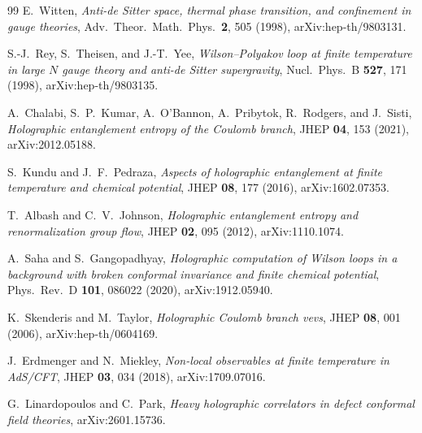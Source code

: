\documentclass[
  aps,
  prd,
  preprint,
  groupedaddress,
  nofootinbib,
  longbibliography
]{revtex4-2}
\theoremstyle{remark}
\begin{document}
\begin{thebibliography}{99}
E.~Witten,
\textit{Anti-de Sitter space, thermal phase transition, and confinement in gauge theories},
Adv.\ Theor.\ Math.\ Phys.\ \textbf{2}, 505 (1998),
arXiv:hep-th/9803131.

S.-J.~Rey, S.~Theisen, and J.-T.~Yee,
\textit{Wilson--Polyakov loop at finite temperature in large $N$ gauge theory and anti-de Sitter supergravity},
Nucl.\ Phys.\ B \textbf{527}, 171 (1998),
arXiv:hep-th/9803135.

A.~Chalabi, S.~P.~Kumar, A.~O'Bannon, A.~Pribytok, R.~Rodgers, and J.~Sisti,
\textit{Holographic entanglement entropy of the Coulomb branch},
JHEP \textbf{04}, 153 (2021),
arXiv:2012.05188.

S.~Kundu and J.~F.~Pedraza,
\textit{Aspects of holographic entanglement at finite temperature and chemical potential},
JHEP \textbf{08}, 177 (2016),
arXiv:1602.07353.

T.~Albash and C.~V.~Johnson,
\textit{Holographic entanglement entropy and renormalization group flow},
JHEP \textbf{02}, 095 (2012),
arXiv:1110.1074.

A.~Saha and S.~Gangopadhyay,
\textit{Holographic computation of Wilson loops in a background with broken conformal invariance and finite chemical potential},
Phys.\ Rev.\ D \textbf{101}, 086022 (2020),
arXiv:1912.05940.

K.~Skenderis and M.~Taylor,
\textit{Holographic Coulomb branch vevs},
JHEP \textbf{08}, 001 (2006),
arXiv:hep-th/0604169.

J.~Erdmenger and N.~Miekley,
\textit{Non-local observables at finite temperature in AdS/CFT},
JHEP \textbf{03}, 034 (2018),
arXiv:1709.07016.

G.~Linardopoulos and C.~Park,
\textit{Heavy holographic correlators in defect conformal field theories},
arXiv:2601.15736.

\end{thebibliography}
\end{document}

